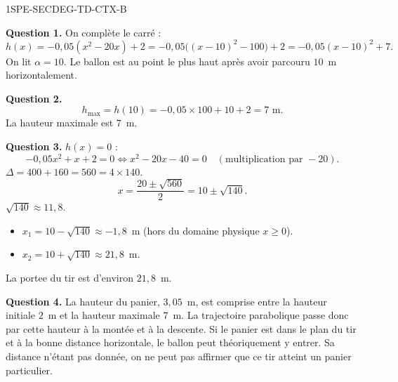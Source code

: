 
\begin{corrige}{1SPE-SECDEG-TD-CTX-B}


\textbf{Question 1.} On complète le carré :
\[
h(x)=-0{,}05(x^2-20x)+2
=-0{,}05\bigl((x-10)^2-100\bigr)+2=-0{,}05(x-10)^2+7.
\]
On lit $\alpha=10$. Le ballon est au point le plus haut après avoir parcouru $10$~m horizontalement.

\textbf{Question 2.}
\[
h_{\max} = h(10) = -0{,}05 \times 100 + 10 + 2 = 7 \text{ m}.
\]
La hauteur maximale est $7$~m.

\textbf{Question 3.} $h(x) = 0$ :
\[
-0{,}05x^2 + x + 2 = 0 \Longleftrightarrow x^2 - 20x - 40 = 0 \quad (\text{multiplication par } -20).
\]
$\Delta = 400 + 160 = 560 = 4 \times 140$.
\[
x = \frac{20 \pm \sqrt{560}}{2} = 10 \pm \sqrt{140}.
\]
$\sqrt{140} \approx 11{,}8$.
\begin{itemize}
  \item $x_1 = 10-\sqrt{140} \approx -1{,}8$~m (hors du domaine physique $x\geq0$).
  \item $x_2 = 10+\sqrt{140} \approx 21{,}8$~m.
\end{itemize}
La portee du tir est d'environ $21{,}8$~m.


\textbf{Question 4.} La hauteur du panier, $3{,}05$~m, est comprise entre la
hauteur initiale $2$~m et la hauteur maximale $7$~m. La trajectoire parabolique
passe donc par cette hauteur à la montée et à la descente. Si le panier est
dans le plan du tir et à la bonne distance horizontale, le ballon peut
théoriquement y entrer. Sa distance n'étant pas donnée, on ne peut pas
affirmer que ce tir atteint un panier particulier.

\end{corrige}

